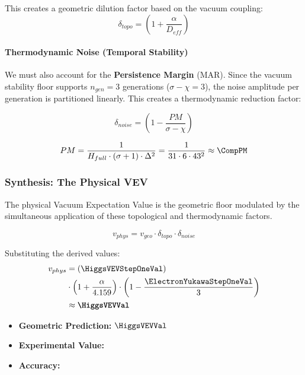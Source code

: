 This creates a geometric dilution factor based on the vacuum coupling:
\begin{equation}
\delta_{topo} = \left( 1 + \frac{\alpha}{D_{eff}} \right)
\end{equation}

\paragraph{Thermodynamic Noise (Temporal Stability)}
We must also account for the \textbf{Persistence Margin} (MAR). Since the vacuum stability floor supports $n_{gen}=3$ generations ($\sigma - \chi = 3$), the noise amplitude per generation is partitioned linearly. This creates a thermodynamic reduction factor:

\begin{equation}
\delta_{noise} = \left( 1 - \frac{PM}{\sigma - \chi} \right)
\end{equation}

\begin{equation}
PM = \frac{1}{H_{full} \cdot (\sigma + 1) \cdot \Delta^2} = \frac{1}{31 \cdot 6 \cdot 43^2} \approx \CompPM
\end{equation}

\subsubsection{Synthesis: The Physical VEV}
The physical Vacuum Expectation Value is the geometric floor modulated by the simultaneous application of these topological and thermodynamic factors.

\begin{equation}
v_{phys} = v_{geo} \cdot \delta_{topo} \cdot \delta_{noise}
\end{equation}

Substituting the derived values:
\begin{equation}
\begin{split}
v_{phys} &= (\HiggsVEVStepOneVal) \\
& \cdot \left( 1 + \frac{\alpha}{4.159} \right) \cdot \left( 1 - \frac{\ElectronYukawaStepOneVal}{3} \right) \\
& \approx \textbf{$\HiggsVEVVal$}
\end{split}
\end{equation}

\begin{itemize}
    \item \textbf{Geometric Prediction:} $\HiggsVEVVal$
    \item \textbf{Experimental Value:} \HiggsVEVExperimentalValue
    \item \textbf{Accuracy:} \HiggsVEVAccText
\end{itemize}


